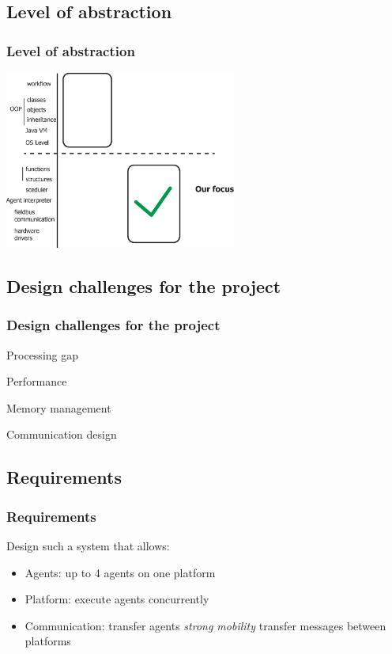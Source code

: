\documentclass{beamer}
\theoremstyle{definition} \newtheorem{mdefinition}{Definition}
\theoremstyle{plain} \newtheorem{mtheorem}{Theorem}
\theoremstyle{plain} \newtheorem{mcorollary}{Corollary}
\theoremstyle{plain} \newtheorem{mfact}{Fact}
\begin{document}
\subsection{Level of abstraction}
\begin{frame}
\frametitle{Level of abstraction}
\begin{centering}
\includegraphics[width=3in]{img/abstraction-3}
\end{centering}
\end{frame}

\subsection{Design challenges for the project}
\begin{frame}
\frametitle{Design challenges for the project}

Processing gap

Performance 

Memory management

Communication design
	

\end{frame}

\subsection{Requirements}
\begin{frame}
	\frametitle{Requirements}
Design such a system that allows:
\begin{itemize}
	\item Agents:
		up to 4 agents on one platform
		 
	\item Platform:
		execute agents concurrently
		
	\item Communication:
		transfer agents {\it strong mobility}
		transfer messages between platforms
\end{itemize}
\end{frame}
\end{document}

